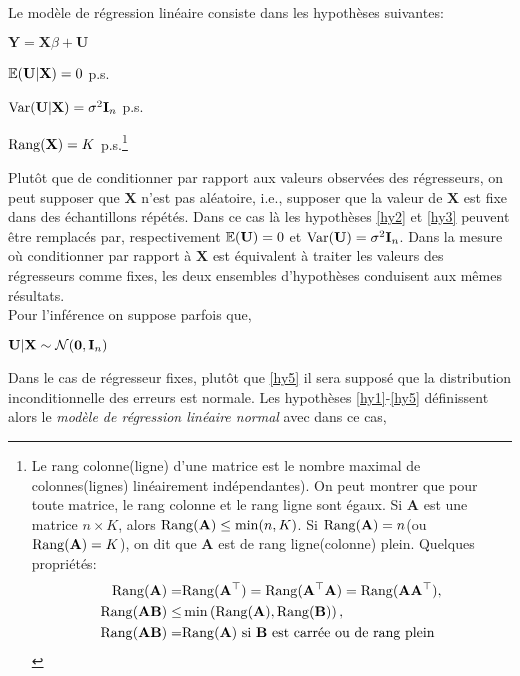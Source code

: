 Le modèle de régression linéaire consiste dans les hypothèses suivantes:
\begin{assumption}
$\mathbf{Y} = \mathbf{X}\beta +\mathbf{U}$
\label{hy1}
\end{assumption}
\begin{assumption}
$\mathbb{E}(\mathbf{U} | \mathbf{X}) = 0$ p.s.
\label{hy2}
\end{assumption}
\begin{assumption}
$\mathrm{Var}(\mathbf{U}|\mathbf{X}) = \sigma^2\mathbf{I}_n$ p.s.
\label{hy3}
\end{assumption}
\begin{assumption}
$\mathrm{Rang}(\mathbf{X}) = K$ p.s.\footnote{Le rang colonne(ligne) d'une matrice est le nombre maximal de colonnes(lignes) linéairement indépendantes). On peut montrer que pour toute matrice, le rang colonne et le rang ligne sont égaux. Si $\mathbf{A}$ est une matrice $n\times K$, alors $\mathrm{Rang}(\mathbf{A}) \leq \min (n, K)$. Si  $\mathrm{Rang}(\mathbf{A}) = n$(ou $\mathrm{Rang}(\mathbf{A}) = K$), on dit que $\mathbf{A}$ est de rang ligne(colonne) plein. Quelques propriétés:
\begin{align*}
\mathrm{Rang}(\mathbf{A}) =& \mathrm{Rang}(\mathbf{A}^\top) =  \mathrm{Rang}(\mathbf{A}^\top \mathbf{A})  =   \mathrm{Rang}(\mathbf{A}\mathbf{A}^\top ),\\
\mathrm{Rang}(\mathbf{A}\mathbf{B}) \leq& \min \left(\mathrm{Rang}(\mathbf{A}), \mathrm{Rang}(\mathbf{B})\right),\\
\mathrm{Rang}(\mathbf{A}\mathbf{B})=&\mathrm{Rang}(\mathbf{A}) \ \textrm{si $\mathbf{B}$ est carrée ou de rang plein}
\end{align*}
  }
\label{hy4}
\end{assumption}
Plutôt que de conditionner par rapport  aux valeurs observées des régresseurs, on peut supposer que $\mathbf{X}$ n'est pas aléatoire, i.e., supposer que la valeur de $\mathbf{X}$ est fixe dans des échantillons répétés. Dans ce cas là les hypothèses \ref{hy2} et \ref{hy3} peuvent être remplacés par, respectivement $\mathbb{E}(\mathbf{U}) = 0$ et $\mathrm{Var}(\mathbf{U}) = \sigma^2\mathbf{I}_n$. Dans la mesure où conditionner par rapport à $\mathbf{X}$ est équivalent à traiter les valeurs des régresseurs comme fixes, les deux ensembles d'hypothèses conduisent aux mêmes résultats.\\
Pour l'inférence on suppose parfois que,
\begin{assumption}
$\mathbf{U} | \mathbf{X} \sim \mathcal{N}(\mathbf{0}, \mathbf{I}_n)$
\label{hy5}
\end{assumption}
Dans le cas de régresseur fixes, plutôt que \ref{hy5} il sera supposé que la distribution inconditionnelle des erreurs est normale. Les hypothèses \ref{hy1}-\ref{hy5} définissent alors le \emph{modèle de régression linéaire normal} avec dans ce cas,
